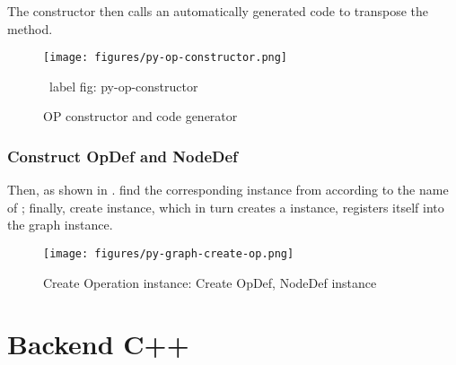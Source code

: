 \begin{content}
The  constructor then calls an automatically generated code to transpose the  method.

\begin{figure}[H]
\centering
\texttt{[image: figures/py-op-constructor.png]}
\caption{OP constructor and code generator}
 \ label {fig: py-op-constructor}
\end{figure}

\subsubsection{Construct OpDef and NodeDef}

Then, as shown in .  find the corresponding  instance from  according to the name of ; finally, create  instance, which in turn creates a  instance, registers itself into the graph instance.

\begin{figure}[H]
\centering
\texttt{[image: figures/py-graph-create-op.png]}
\caption{Create Operation instance: Create OpDef, NodeDef instance}
 \label{fig:py-graph-create-op}
\end{figure}

\end{content}

\section{Backend C++}

